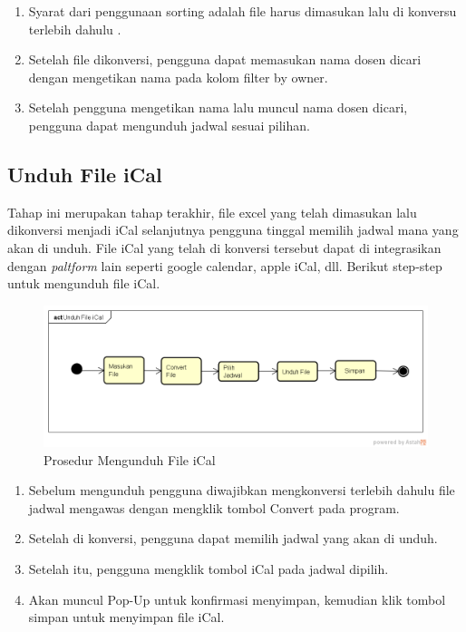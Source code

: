 \begin{enumerate}
	\item Syarat dari penggunaan sorting adalah file harus dimasukan lalu di konversu terlebih dahulu .
	\item Setelah file dikonversi, pengguna dapat memasukan nama dosen dicari dengan mengetikan nama pada kolom filter by owner.
	\item Setelah pengguna mengetikan nama lalu muncul nama dosen dicari, pengguna dapat mengunduh jadwal sesuai pilihan.
\end{enumerate}

\subsection{Unduh File iCal}
Tahap ini merupakan tahap terakhir, file excel yang telah dimasukan lalu dikonversi menjadi iCal selanjutnya pengguna tinggal memilih jadwal mana yang akan di unduh. File iCal yang telah di konversi tersebut dapat di integrasikan dengan \textit{paltform} lain seperti google calendar, apple iCal, dll. Berikut step-step untuk mengunduh file iCal.
\begin{figure}[h]
	\centering
	\includegraphics[scale=0.5]{Gambar/Unduh-File-iCal}
	\caption{Prosedur Mengunduh File iCal}
	\end{figure}

\begin{enumerate}
	\item Sebelum mengunduh pengguna diwajibkan mengkonversi terlebih dahulu file jadwal mengawas dengan mengklik tombol Convert pada program.
	\item Setelah di konversi, pengguna dapat memilih jadwal yang akan di unduh.
	\item Setelah itu, pengguna mengklik tombol iCal pada jadwal dipilih.
	\item Akan muncul Pop-Up untuk konfirmasi menyimpan, kemudian klik tombol simpan untuk menyimpan file iCal.
\end{enumerate}

